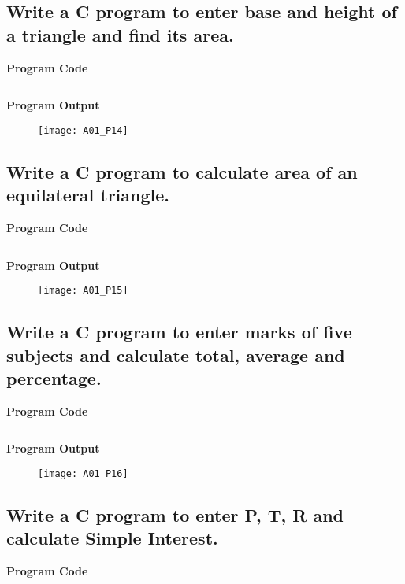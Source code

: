 \subsection{Write a C program to enter base and height of a triangle and find its area.}
\textbf{Program Code}

\inputminted{C}{programs/A01_P14.c}

\textbf{Program Output}

\begin{figure}[h]
  \texttt{[image: A01\_P14]}
\end{figure}

\newpage



\subsection{Write a C program to calculate area of an equilateral triangle.}
\textbf{Program Code}

\inputminted{C}{programs/A01_P15.c}

\textbf{Program Output}

\begin{figure}[h]
  \texttt{[image: A01\_P15]}
\end{figure}

\newpage



\subsection{Write a C program to enter marks of five subjects and calculate total, average and percentage.}
\textbf{Program Code}

\inputminted{C}{programs/A01_P16.c}

\textbf{Program Output}

\begin{figure}[h]
  \texttt{[image: A01\_P16]}
\end{figure}

\newpage



\subsection{Write a C program to enter P, T, R and calculate Simple Interest.}
\textbf{Program Code}

